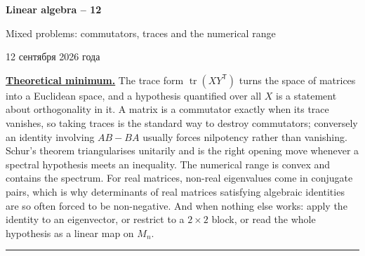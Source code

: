 \documentclass[11pt,a4paper]{article}
\newcommand{\head}[1]{\par\noindent\textbf{\underline{#1}}\quad}
\newcommand{\sheettitle}[4]{%
  \begin{center}
  {\huge\bfseries #1\par}\vspace{\dimexpr1.2em-1pt\relax minus 3.6pt}
  {\Large #2\par}\vspace{\dimexpr1em+1pt\relax minus 1.2pt}
  \if\relax\detokenize{#3}\relax\else{\Large #3\par}\vspace{\dimexpr1.15em-1pt\relax minus 3.6pt}\fi
  {\foreignlanguage{russian}{#4}\par}
  \end{center}\vspace{0.5pt minus 1.2pt}}
\DeclareMathOperator{\tr}{tr}
\newcommand{\T}{\mathsf T}
\begin{document}
\sheettitle{Linear algebra -- 12}{Mixed problems: commutators, traces and the numerical range}{Homework}{12 сентября 2026 года}

\head{Theoretical minimum.} The trace form $\tr(XY^\T)$ turns the space of matrices into a
Euclidean space, and a hypothesis quantified over all $X$ is a statement about orthogonality in
it. A matrix is a commutator exactly when its trace vanishes, so taking traces is the standard
way to destroy commutators; conversely an identity involving $AB-BA$ usually forces nilpotency
rather than vanishing. Schur's theorem triangularises unitarily and is the right opening move
whenever a spectral hypothesis meets an inequality. The numerical range is convex and contains
the spectrum. For real matrices, non-real eigenvalues come in conjugate pairs, which is why
determinants of real matrices satisfying algebraic identities are so often forced to be
non-negative. And when nothing else works: apply the identity to an eigenvector, or restrict to a
$2\times2$ block, or read the whole hypothesis as a linear map on $M_n$.

\par\vspace{-1pt}\noindent\rule{\linewidth}{0.4pt}\par\vspace{7pt}
\end{document}

